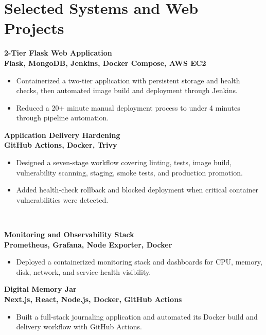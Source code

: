 \documentclass[9pt,a4paper]{article}
\newcommand{\project}[3]{\textbf{\color{dark}#1}\\[-1pt]{\footnotesize\bfseries\color{accent}#2}\begin{itemize}#3\end{itemize}}
\begin{document}
\section{Selected Systems and Web Projects}
\noindent\begin{minipage}[t]{0.49\textwidth}\vspace{0pt}
\project{2-Tier Flask Web Application}{Flask, MongoDB, Jenkins, Docker Compose, AWS EC2}{
  \item Containerized a two-tier application with persistent storage and health checks, then automated image build and deployment through Jenkins.
  \item Reduced a 20+ minute manual deployment process to under 4 minutes through pipeline automation.
}
\end{minipage}\hfill
\begin{minipage}[t]{0.49\textwidth}\vspace{0pt}
\project{Application Delivery Hardening}{GitHub Actions, Docker, Trivy}{
  \item Designed a seven-stage workflow covering linting, tests, image build, vulnerability scanning, staging, smoke tests, and production promotion.
  \item Added health-check rollback and blocked deployment when critical container vulnerabilities were detected.
}
\end{minipage}\\[-2pt]
\begin{minipage}[t]{0.49\textwidth}\vspace{0pt}
\project{Monitoring and Observability Stack}{Prometheus, Grafana, Node Exporter, Docker}{
  \item Deployed a containerized monitoring stack and dashboards for CPU, memory, disk, network, and service-health visibility.
}
\end{minipage}\hfill
\begin{minipage}[t]{0.49\textwidth}\vspace{0pt}
\project{Digital Memory Jar}{Next.js, React, Node.js, Docker, GitHub Actions}{
  \item Built a full-stack journaling application and automated its Docker build and delivery workflow with GitHub Actions.
}
\end{minipage}
\end{document}
